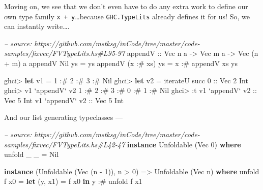 \documentclass[]{article}
\newenvironment{Shaded}{}{}
\newcommand{\KeywordTok}[1]{\textcolor[rgb]{0.00,0.44,0.13}{\textbf{#1}}}
\newcommand{\DataTypeTok}[1]{\textcolor[rgb]{0.56,0.13,0.00}{#1}}
\newcommand{\DecValTok}[1]{\textcolor[rgb]{0.25,0.63,0.44}{#1}}
\newcommand{\CommentTok}[1]{\textcolor[rgb]{0.38,0.63,0.69}{\textit{#1}}}
\newcommand{\OtherTok}[1]{\textcolor[rgb]{0.00,0.44,0.13}{#1}}
\newcommand{\FunctionTok}[1]{\textcolor[rgb]{0.02,0.16,0.49}{#1}}
\newcommand{\NormalTok}[1]{#1}
\begin{document}
Moving on, we see that we don't even have to do any extra work to define our own
type family \texttt{x\ +\ y}\ldots{}because \texttt{GHC.TypeLits} already
defines it for us! So, we can instantly write\ldots{}.

\begin{Shaded}
\begin{Highlighting}[]
\CommentTok{-- source: https://github.com/mstksg/inCode/tree/master/code-samples/fixvec/FVTypeLits.hs#L95-97}
\OtherTok{appendV ::} \DataTypeTok{Vec}\NormalTok{ n a }\OtherTok{->} \DataTypeTok{Vec}\NormalTok{ m a }\OtherTok{->} \DataTypeTok{Vec}\NormalTok{ (n }\FunctionTok{+}\NormalTok{ m) a}
\NormalTok{appendV }\DataTypeTok{Nil}\NormalTok{       ys }\FunctionTok{=}\NormalTok{ ys}
\NormalTok{appendV (x }\FunctionTok{:#}\NormalTok{ xs) ys }\FunctionTok{=}\NormalTok{ x }\FunctionTok{:#}\NormalTok{ appendV xs ys}
\end{Highlighting}
\end{Shaded}

\begin{Shaded}
\begin{Highlighting}[]
\NormalTok{ghci}\FunctionTok{>} \KeywordTok{let}\NormalTok{ v1 }\FunctionTok{=} \DecValTok{1} \FunctionTok{:#} \DecValTok{2} \FunctionTok{:#} \DecValTok{3} \FunctionTok{:#} \DataTypeTok{Nil}
\NormalTok{ghci}\FunctionTok{>} \KeywordTok{let}\NormalTok{ v2 }\FunctionTok{=}\NormalTok{ iterateU succ }\DecValTok{0}\OtherTok{ ::} \DataTypeTok{Vec} \DecValTok{2} \DataTypeTok{Int}
\NormalTok{ghci}\FunctionTok{>}\NormalTok{ v1 }\OtherTok{`appendV`}\NormalTok{ v2}
\DecValTok{1} \FunctionTok{:#} \DecValTok{2} \FunctionTok{:#} \DecValTok{3} \FunctionTok{:#} \DecValTok{0} \FunctionTok{:#} \DecValTok{1} \FunctionTok{:#} \DataTypeTok{Nil}
\NormalTok{ghci}\FunctionTok{>} \FunctionTok{:}\NormalTok{t v1 }\OtherTok{`appendV` v2 ::} \DataTypeTok{Vec} \DecValTok{5} \DataTypeTok{Int}
\NormalTok{v1 }\OtherTok{`appendV` v2 ::} \DataTypeTok{Vec} \DecValTok{5} \DataTypeTok{Int}
\end{Highlighting}
\end{Shaded}

And our list generating typeclasses ---

\begin{Shaded}
\begin{Highlighting}[]
\CommentTok{-- source: https://github.com/mstksg/inCode/tree/master/code-samples/fixvec/FVTypeLits.hs#L42-47}
\KeywordTok{instance} \DataTypeTok{Unfoldable}\NormalTok{ (}\DataTypeTok{Vec} \DecValTok{0}\NormalTok{) }\KeywordTok{where}
\NormalTok{    unfold _ _ }\FunctionTok{=} \DataTypeTok{Nil}

\KeywordTok{instance}\NormalTok{ (}\DataTypeTok{Unfoldable}\NormalTok{ (}\DataTypeTok{Vec}\NormalTok{ (n }\FunctionTok{-} \DecValTok{1}\NormalTok{)), n }\FunctionTok{>} \DecValTok{0}\NormalTok{) }\OtherTok{=>} \DataTypeTok{Unfoldable}\NormalTok{ (}\DataTypeTok{Vec}\NormalTok{ n) }\KeywordTok{where}
\NormalTok{    unfold f x0 }\FunctionTok{=} \KeywordTok{let}\NormalTok{ (y, x1) }\FunctionTok{=}\NormalTok{ f x0}
                  \KeywordTok{in}\NormalTok{  y }\FunctionTok{:#}\NormalTok{ unfold f x1}
\end{Highlighting}
\end{Shaded}
\end{document}
